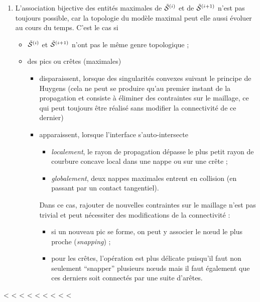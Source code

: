 \begin{enumerate}
	\item L'association bijective des entités maximales de $\tilde{\mathcal{S}}^{(i)}$ et de $\tilde{\mathcal{S}}^{(i+1)}$ n'est pas toujours possible, car la topologie du modèle maximal peut elle aussi évoluer au cours du temps.
	C'est le cas si
    \begin{itemize}
        \item $\tilde{\mathcal{S}}^{(i)}$ et $\tilde{\mathcal{S}}^{(i+1)}$ n'ont pas le même genre topologique ;
        \item des pics ou crêtes (maximales)
        \begin{itemize}
            \item disparaissent, lorsque des singularités convexes  suivant le principe de Huygens (cela ne peut se produire qu'au premier instant de la propagation et consiste à éliminer des contraintes sur le maillage, ce qui peut toujours être réalisé sans modifier la connectivité de ce dernier)
            \item apparaissent, lorsque l'interface s'auto-intersecte
            \begin{itemize}
                \item \textit{localement}, \ie le rayon de propagation dépasse le plus petit rayon de courbure concave local dans une nappe ou sur une crête ;
                \item \textit{globalement}, \eg deux nappes maximales entrent en collision (en passant par un contact tangentiel).
            \end{itemize} 
            Dans ce cas, rajouter de nouvelles contraintes sur le maillage n'est pas trivial et peut nécessiter des modifications de la connectivité :
            \begin{itemize}
                \item si un nouveau pic se forme, on peut y associer le n\oe ud le plus proche (\textit{snapping}) ;
                \item pour les crêtes, l'opération est plus délicate puisqu'il faut non seulement ``snapper'' plusieurs n\oe uds mais il faut également que ces derniers soit connectés par une suite d'arêtes.
            \end{itemize}
        \end{itemize}
    \end{itemize}
	
\end{enumerate}

< < < < < < < < <








